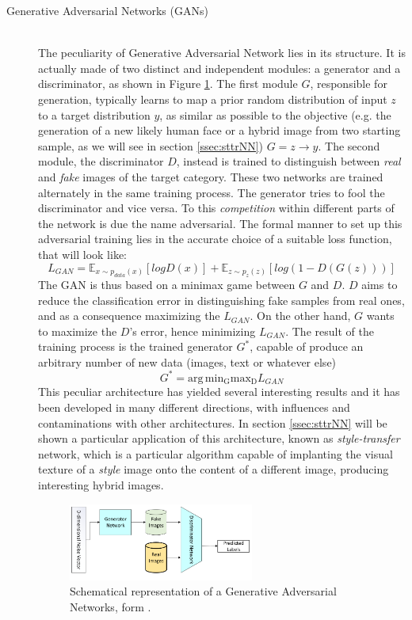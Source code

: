 \begin{description}
    \item [Generative Adversarial Networks (GANs)] \hfill \\
        The peculiarity of Generative Adversarial Network lies in its structure. It is actually made of two distinct and independent modules: a generator and a discriminator, as shown in Figure \ref{fig:GAN}. The first module $G$, responsible for generation, typically learns to map a prior random distribution of input $z$ to a target distribution $y$, as similar as possible to the objective (e.g. the generation of a new likely human face or a hybrid image from two starting sample, as we will see in section \ref{ssec:sttrNN}) $G = z \rightarrow y$. The second module, the discriminator $D$, instead is trained to distinguish between \textit{real} and \textit{fake} images of the target category. These two networks are trained alternately in the same training process. The generator tries to fool the discriminator and vice versa. To this \textit{competition} within different parts of the network is due the name adversarial. The formal manner to set up this adversarial training lies in the accurate choice of a suitable loss function, that will look like: $$L_{GAN} = \mathbb{E}_{x \sim p_{data}(x)}[logD(x)] + \mathbb{E}_{z \sim p_{z}(z)}[log(1-D(G(z)))]$$
        The GAN is thus based on a minimax game between $G$ and $D$. $D$ aims to reduce the classification error in distinguishing fake samples from real ones, and as a consequence maximizing the $L_{GAN}$. On the other hand, $G$ wants to maximize the $D$'s error, hence minimizing $L_{GAN}$. The result of the training process is the trained generator $G^*$, capable of produce an arbitrary number of new data (images, text or whatever else) $$ G^* = \operatorname*{arg\,min_Gmax_D} L_{GAN}$$
        This peculiar architecture has yielded several interesting results and it has been developed in many different directions, with influences and contaminations with other architectures. In section \ref{ssec:sttrNN} will be shown a particular application of this architecture, known as \textit{style-transfer} network, which is a particular algorithm capable of implanting the visual texture of a \textit{style} image onto the content of a different image, producing interesting hybrid images.


        \begin{figure}
            \centering
            \includegraphics[width = 0.6\textwidth]{images/GAN}
            \caption{Schematical representation of a Generative Adversarial Networks, form \cite{deep_seg_SOA}.}
            \label{fig:GAN}
        \end{figure}



\end{description}
